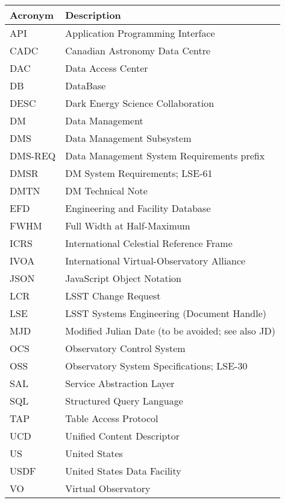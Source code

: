 \addtocounter{table}{-1}
\begin{longtable}{p{}p{}}\hline
\textbf{Acronym} & \textbf{Description}  \\\hline

API & Application Programming Interface \\\hline
CADC & Canadian Astronomy Data Centre \\\hline
DAC & Data Access Center \\\hline
DB & DataBase \\\hline
DESC & Dark Energy Science Collaboration \\\hline
DM & Data Management \\\hline
DMS & Data Management Subsystem \\\hline
DMS-REQ & Data Management System Requirements prefix \\\hline
DMSR & DM System Requirements; LSE-61 \\\hline
DMTN & DM Technical Note \\\hline
EFD & Engineering and Facility Database \\\hline
FWHM & Full Width at Half-Maximum \\\hline
ICRS & International Celestial Reference Frame \\\hline
IVOA & International Virtual-Observatory Alliance \\\hline
JSON & JavaScript Object Notation \\\hline
LCR & LSST Change Request \\\hline
LSE & LSST Systems Engineering (Document Handle) \\\hline
MJD & Modified Julian Date (to be avoided; see also JD) \\\hline
OCS & Observatory Control System \\\hline
OSS & Observatory System Specifications; LSE-30 \\\hline
SAL & Service Abstraction Layer \\\hline
SQL & Structured Query Language \\\hline
TAP & Table Access Protocol \\\hline
UCD & Unified Content Descriptor \\\hline
US & United States \\\hline
USDF & United States Data Facility \\\hline
VO & Virtual Observatory \\\hline
\end{longtable}
